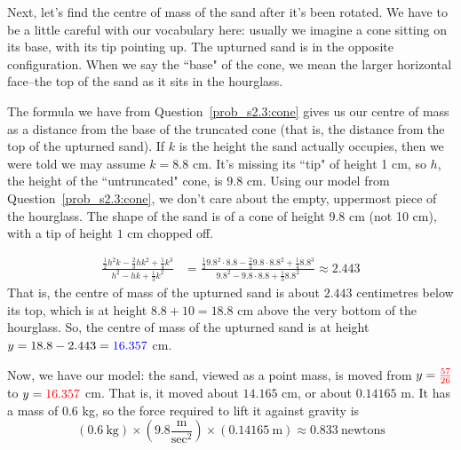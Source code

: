 \begin{solution}
Next, let's find the centre of mass of the sand after it's been rotated. We have to be a little careful with our vocabulary here: usually we imagine a cone sitting on its base, with its tip pointing up. The upturned sand is in the opposite configuration. When we say the ``base" of the cone, we mean the larger horizontal face--the top of the sand as it sits in the hourglass.

The formula we have from Question~\ref{prob_s2.3:cone} gives us our centre of mass as a distance from the base of the truncated cone (that is, the distance from the top of the upturned sand).
 If $k$ is the height the sand actually occupies, then we were told we may assume $k=8.8$ cm. It's missing its ``tip" of height 1 cm, so $h$, the height of the ``untruncated" cone, is $9.8$ cm. Using our model from Question~\ref{prob_s2.3:cone}, we don't care about the empty, uppermost piece of the hourglass. The shape of the sand is of a cone of height 9.8 cm (not 10 cm), with a tip of height $1$ cm chopped off.
\begin{center} \end{center}
\begin{align*}
\frac{\frac{1}{2}h^2k - \frac{2}{3}hk^2+\frac{1}{4}k^3}{h^2-hk+\frac{1}{3}k^2}&=
\frac{\frac{1}{2}9.8^2\cdot 8.8 - \frac{2}{3}9.8\cdot 8.8^2+\frac{1}{4}8.8^3}{9.8^2-9.8\cdot 8.8+\frac{1}{3}8.8^2}\approx 2.443%
\end{align*}
That is, the centre of mass of the upturned sand is about $2.443$ centimetres below its top, which is at height $8.8+10=18.8$ cm above the very bottom of the hourglass. So, the centre of mass of the upturned sand is at height $y=18.8-2.443= \textcolor{blue}{16.357}$ cm.

Now, we have our model: the sand, viewed as a point mass, is moved from $y=\textcolor{red}{\frac{57}{26}}$ to $y=\textcolor{red}{16.357}$ cm. That is, it moved about $14.165$ cm, or about $0.14165$ m. It has a mass of $0.6$ kg, so the force required to lift it against gravity is
\[\left(0.6~\text{kg}\right)\times \left(9.8 \frac{\text{m}}{\text{sec}^2}\right)\times\left(0.14165~\text{m}\right)\approx 0.833~\text{newtons}\]

\end{solution}
